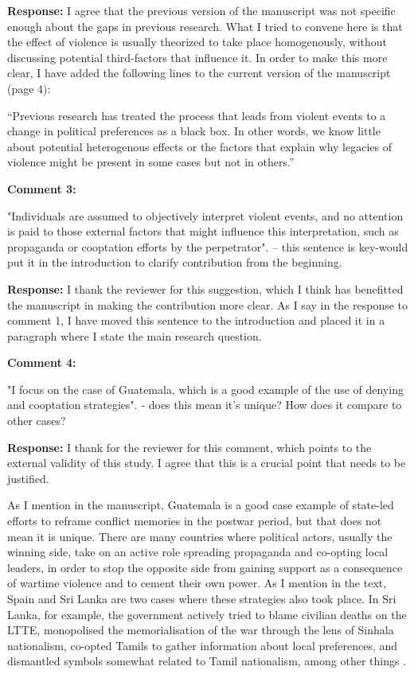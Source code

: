 \documentclass[12pt, a4paper, notitlepage]{article}
\begin{document}
\noindent\textbf{Response:} I agree that the previous version of the manuscript was not specific enough about the gaps in previous research. What I tried to convene here is that the effect of violence is usually theorized to take place homogenously, without discussing potential third-factors that influence it. In order to make this more clear, I have added the following lines to the current version of the manuscript (page 4):

``Previous research has treated the process that leads from violent events to a change in political preferences as a black box.
In other words, we know little about potential heterogenous effects or the factors that explain why legacies of violence might be present in some cases but not in others.''


\vspace{15pt}
\noindent\textbf{Comment 3:}
\begin{displayquote}
"Individuals are assumed to objectively interpret violent events, and no attention is paid to those external factors that might influence this interpretation, such as propaganda or cooptation efforts by the perpetrator". -- this sentence is key-would put it in the introduction to clarify contribution from the beginning.
\end{displayquote}

\noindent\textbf{Response:} I thank the reviewer for this suggestion, which I think has benefitted the manuscript in making the contribution more clear. As I say in the response to comment 1, I have moved this sentence to the introduction and placed it in a paragraph where I state the main research question.

\vspace{15pt}
\noindent\textbf{Comment 4:}
\begin{displayquote}
"I focus on the case of Guatemala, which is a good example of the use of denying and cooptation strategies". - does this mean it's unique? How does it compare to other cases?
\end{displayquote}

\noindent\textbf{Response:} I thank for the reviewer for this comment, which points to the external validity of this study. I agree that this is a crucial point that needs to be justified.

As I mention in the manuscript, Guatemala is a good case example of state-led efforts to reframe conflict memories in the postwar period, but that does not mean it is unique.
There are many countries where political actors, usually the winning side, take on an active role spreading propaganda and co-opting local leaders, in order to stop the opposite side from gaining support as a consequence of wartime violence and to cement their own power.
As I mention in the text, Spain and Sri Lanka are two cases where these strategies also took place.
In Sri Lanka, for example, the government actively tried to blame civilian deaths on the LTTE, monopolised the memorialisation of the war through the lens of Sinhala nationalism, co-opted Tamils to gather information about local preferences, and dismantled symbols somewhat related to Tamil nationalism, among other things \citep{Subramanian:2016vk, Seoighe:2017aa, Kapur:2020we}.
\end{document}

